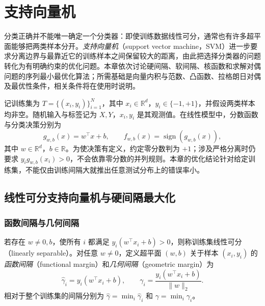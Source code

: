 \setcounter{chapter}{6} %
\chapter{支持向量机}
\label{chap:lihang-svm}

分类正确并不能唯一确定一个分类器：即使训练数据线性可分，通常也有许多超平面能够把两类样本分开。\emph{支持向量机}（support vector machine，SVM）进一步要求分离边界与最靠近它的训练样本之间保留较大的距离，由此把选择分类器的问题转化为有明确约束的优化问题。本章依次讨论硬间隔、软间隔、核函数和求解对偶问题的序列最小最优化算法；所需基础是向量内积与范数、凸函数、拉格朗日对偶及最优性条件，相关条件将在使用时说明。

记训练集为 $T=\{(x_i,y_i)\}_{i=1}^{N}$，其中 $x_i\in\mathbb R^d$，$y_i\in\{-1,+1\}$，并假设两类样本均非空。随机输入与标签记为 $X,Y$，$x_i,y_i$ 是其观测值。在线性模型中，分数函数与分类决策分别为
\begin{equation}
  g_{w,b}(x)=w^\top x+b,
  \qquad f_{w,b}(x)=\operatorname{sign}(g_{w,b}(x)),
  \label{eq:lihang-svm-score}
\end{equation}
其中 $w\in\mathbb R^d$，$b\in\mathbb R$。为使决策有定义，约定零分数判为 $+1$；涉及严格分离时仍要求 $y_i g_{w,b}(x_i)>0$，不会依靠零分数的并列规则。本章的优化结论针对给定训练集，不能仅由训练间隔大就推出任意测试分布上的错误率小。

\section{线性可分支持向量机与硬间隔最大化}
\label{sec:lihang-svm-hard}

\subsection{函数间隔与几何间隔}

\begin{definition}[线性可分与两种间隔]
若存在 $w\ne0,b$，使所有 $i$ 都满足 $y_i(w^\top x_i+b)>0$，则称训练集线性可分（linearly separable）。对任意 $w\ne0$，定义超平面 $(w,b)$ 关于样本 $(x_i,y_i)$ 的\emph{函数间隔}（functional margin）和\emph{几何间隔}（geometric margin）为
\begin{equation}
  \widehat\gamma_i=y_i(w^\top x_i+b),
  \qquad
  \gamma_i=\frac{y_i(w^\top x_i+b)}{\lVert w\rVert_2}.
  \label{eq:lihang-svm-margins}
\end{equation}
相对于整个训练集的间隔分别为 $\widehat\gamma=\min_i\widehat\gamma_i$ 和 $\gamma=\min_i\gamma_i$。
\end{definition}

